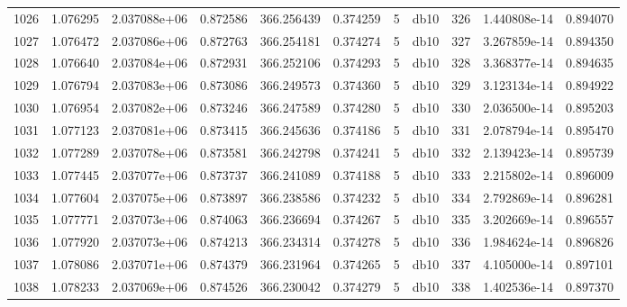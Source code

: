 \begin{tabular}{lrrrrrrlrrr}
1026 &    1.076295 &        2.037088e+06 &  0.872586 &              366.256439 &    0.374259 &       5 &         db10 &    326 &   1.440808e-14 &      0.894070 \\
1027 &    1.076472 &        2.037086e+06 &  0.872763 &              366.254181 &    0.374274 &       5 &         db10 &    327 &   3.267859e-14 &      0.894350 \\
1028 &    1.076640 &        2.037084e+06 &  0.872931 &              366.252106 &    0.374293 &       5 &         db10 &    328 &   3.368377e-14 &      0.894635 \\
1029 &    1.076794 &        2.037083e+06 &  0.873086 &              366.249573 &    0.374360 &       5 &         db10 &    329 &   3.123134e-14 &      0.894922 \\
1030 &    1.076954 &        2.037082e+06 &  0.873246 &              366.247589 &    0.374280 &       5 &         db10 &    330 &   2.036500e-14 &      0.895203 \\
1031 &    1.077123 &        2.037081e+06 &  0.873415 &              366.245636 &    0.374186 &       5 &         db10 &    331 &   2.078794e-14 &      0.895470 \\
1032 &    1.077289 &        2.037078e+06 &  0.873581 &              366.242798 &    0.374241 &       5 &         db10 &    332 &   2.139423e-14 &      0.895739 \\
1033 &    1.077445 &        2.037077e+06 &  0.873737 &              366.241089 &    0.374188 &       5 &         db10 &    333 &   2.215802e-14 &      0.896009 \\
1034 &    1.077604 &        2.037075e+06 &  0.873897 &              366.238586 &    0.374232 &       5 &         db10 &    334 &   2.792869e-14 &      0.896281 \\
1035 &    1.077771 &        2.037073e+06 &  0.874063 &              366.236694 &    0.374267 &       5 &         db10 &    335 &   3.202669e-14 &      0.896557 \\
1036 &    1.077920 &        2.037073e+06 &  0.874213 &              366.234314 &    0.374278 &       5 &         db10 &    336 &   1.984624e-14 &      0.896826 \\
1037 &    1.078086 &        2.037071e+06 &  0.874379 &              366.231964 &    0.374265 &       5 &         db10 &    337 &   4.105000e-14 &      0.897101 \\
1038 &    1.078233 &        2.037069e+06 &  0.874526 &              366.230042 &    0.374279 &       5 &         db10 &    338 &   1.402536e-14 &      0.897370 \\

\end{tabular}
